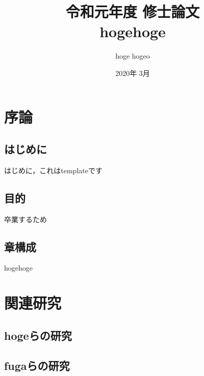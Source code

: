 \documentclass[uplatex,report]{jsbook}
\begin{document}
\title{令和元年度 修士論文\\
hogehoge}
\author{hoge hogeo}
\date{2020年 3月}
\maketitle
\tableofcontents

\chapter{序論}
\section{はじめに}
はじめに，これはtemplateです
\section{目的}
卒業するため
\section{章構成}
hogehoge
\chapter{関連研究}
\section{hogeらの研究}
\section{fugaらの研究}
\end{document}
